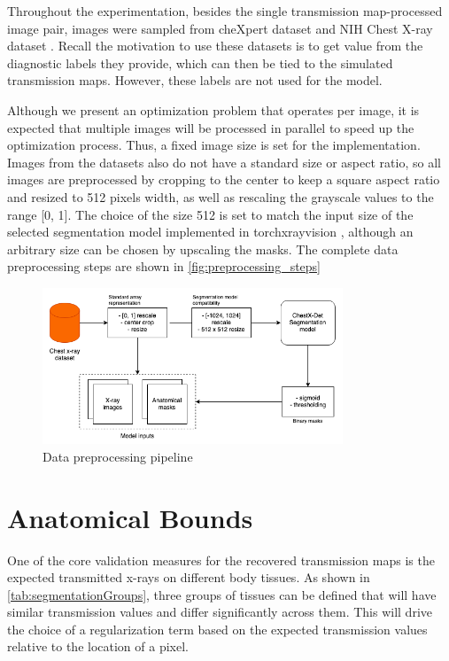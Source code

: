 \documentclass[nomenclature, english, bibtex]{kththesis}
\numberwithin{listing}{chapter}
\begin{document}
Throughout the experimentation, besides the single transmission map-processed image pair, images were sampled from
cheXpert dataset \cite{chexpert} and NIH Chest X-ray dataset \cite{nih}. Recall the motivation to use these datasets
is to get value from the diagnostic labels they provide, which can then be tied to the simulated transmission maps.
However, these labels are not used for the model.

Although we present an optimization problem that operates per image, it is expected that multiple images will
be processed in parallel to speed up the optimization process. Thus, a fixed image size is set for the implementation.
Images from the datasets also do not have a standard size or aspect ratio, so all images are preprocessed by
cropping to the center to keep a square aspect ratio and resized to 512 pixels width, as well as rescaling the
grayscale values to the range [0, 1]. The choice of the size 512 is set to match the input size of the selected
segmentation model implemented in torchxrayvision \cite{torchxrayvision}, although an arbitrary size can be chosen
by upscaling the masks. The complete data preprocessing steps are shown in \autoref{fig:preprocessing_steps}

\begin{figure}[H]
    \centering
    \includegraphics[width=0.8\textwidth]{figures/data_loading.png}
    \caption{Data preprocessing pipeline}
    \label{fig:preprocessing_steps}
\end{figure}


\section{Anatomical Bounds}


One of the core validation measures for the recovered transmission maps is the expected transmitted x-rays on
different body tissues. As shown in \autoref{tab:segmentationGroups}, three groups of tissues
can be defined that will have similar transmission values and differ significantly across them. This
will drive the choice of a regularization term based on the expected transmission values relative to
the location of a pixel.
\end{document}
